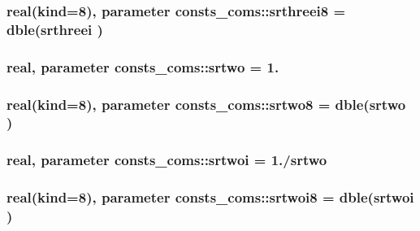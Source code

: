 \subsubsection[{\texorpdfstring{srthreei8}{srthreei8}}]{\setlength{\rightskip}{0pt plus 5cm}real(kind=8), parameter consts\+\_\+coms\+::srthreei8 = dble({\bf srthreei} )}\hypertarget{namespaceconsts__coms_a0b5dc83302d90a8e7fe30ffed222c517}{}\label{namespaceconsts__coms_a0b5dc83302d90a8e7fe30ffed222c517}
\subsubsection[{\texorpdfstring{srtwo}{srtwo}}]{\setlength{\rightskip}{0pt plus 5cm}real, parameter consts\+\_\+coms\+::srtwo = 1.}\hypertarget{namespaceconsts__coms_ad2093037aef885081f727f22fe6b2554}{}\label{namespaceconsts__coms_ad2093037aef885081f727f22fe6b2554}
\subsubsection[{\texorpdfstring{srtwo8}{srtwo8}}]{\setlength{\rightskip}{0pt plus 5cm}real(kind=8), parameter consts\+\_\+coms\+::srtwo8 = dble({\bf srtwo} )}\hypertarget{namespaceconsts__coms_a3cc8958e1839e97fd0518a4597b913a8}{}\label{namespaceconsts__coms_a3cc8958e1839e97fd0518a4597b913a8}
\subsubsection[{\texorpdfstring{srtwoi}{srtwoi}}]{\setlength{\rightskip}{0pt plus 5cm}real, parameter consts\+\_\+coms\+::srtwoi = 1./{\bf srtwo}}\hypertarget{namespaceconsts__coms_a1dbb872d0aae3243d72b9c43864ec88f}{}\label{namespaceconsts__coms_a1dbb872d0aae3243d72b9c43864ec88f}
\subsubsection[{\texorpdfstring{srtwoi8}{srtwoi8}}]{\setlength{\rightskip}{0pt plus 5cm}real(kind=8), parameter consts\+\_\+coms\+::srtwoi8 = dble({\bf srtwoi} )}\hypertarget{namespaceconsts__coms_a3360764f696a099efdec0e23febe82d8}{}\label{namespaceconsts__coms_a3360764f696a099efdec0e23febe82d8}
